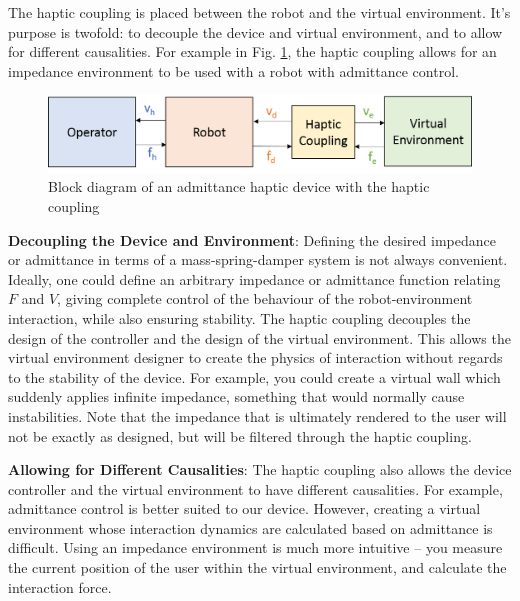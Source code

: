 \documentclass[12pt]{report}
\begin{document}
	The haptic coupling is placed between the robot and the virtual environment. It's purpose is twofold: to decouple the device and virtual environment, and to allow for different causalities. For example  in Fig. \ref{fig:haptic_adm_coup}, the haptic coupling allows for an impedance environment to be used with a robot with admittance control. 
	
			\begin{figure}[h] 
		\centering
		\includegraphics[width=\linewidth]{haptic_admittance_coupling}
		\caption{Block diagram of an admittance haptic device with the haptic coupling}
		\label{fig:haptic_adm_coup}
	\end{figure}	

	
	\textbf{Decoupling the Device and Environment}: Defining the desired impedance or admittance in terms of a mass-spring-damper system is not always convenient. Ideally, one could define an arbitrary impedance or admittance function relating $F$ and $V$, giving complete control of the behaviour of the robot-environment interaction, while also ensuring stability. The haptic coupling decouples the design of the controller and the design of the virtual environment. This allows the virtual environment designer to create the physics of interaction without regards to the stability of the device. For example, you could create a virtual wall which suddenly applies infinite impedance, something that would normally cause instabilities. Note that the impedance that is ultimately rendered to the user will not be exactly as designed, but will be filtered through the haptic coupling.
	

	
	\textbf{Allowing for Different Causalities}: The haptic coupling also allows the device controller and the virtual environment to have different causalities. For example, admittance control is better suited to our device. However, creating a virtual environment whose interaction dynamics are calculated based on admittance is difficult. Using an impedance environment is much more intuitive -- you measure the current position of the user within the virtual environment, and calculate the interaction force. \\
		
	
\end{document}
